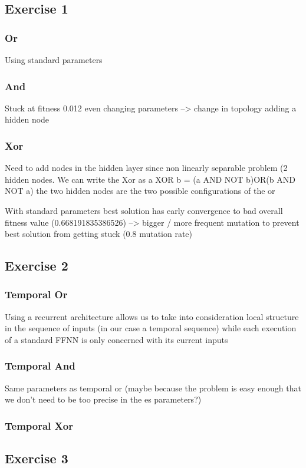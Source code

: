 \subsection{Exercise 1}
\subsubsection*{Or}
Using standard parameters
\subsubsection*{And}
Stuck at fitness 0.012 even changing parameters --> change in topology adding a hidden node
\subsubsection*{Xor}
Need to add nodes in the hidden layer since non linearly separable problem (2 hidden nodes.
We can write the Xor as a XOR b = (a AND NOT b)OR(b AND NOT a)
the two hidden nodes are the two possible configurations of the or

With standard parameters best solution has early convergence to bad overall fitness value (0.668191835386526) --> bigger / more frequent mutation to prevent best solution from getting stuck (0.8 mutation rate) 
\subsection{Exercise 2}
\subsubsection*{Temporal Or}
Using a recurrent architecture allows us to take into consideration local structure in the sequence of inputs (in our case a temporal sequence) while each execution of a standard FFNN is only concerned with its current inputs

\subsubsection*{Temporal And}
Same parameters as temporal or (maybe because the problem is easy enough that we don't need to be too precise in the es parameters?)

\subsubsection*{Temporal Xor}
\subsection{Exercise 3}
